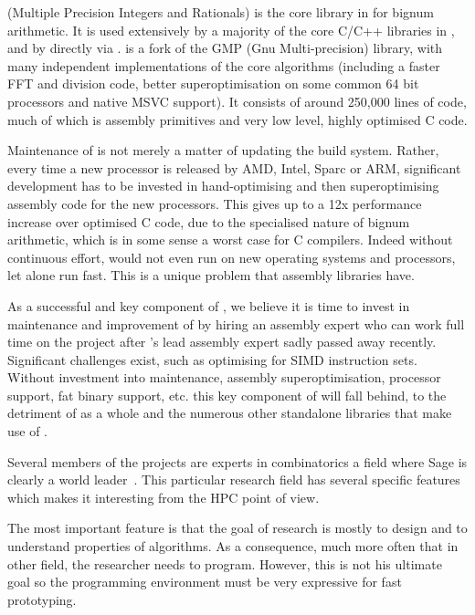 \begin{workpackage}
\begin{tasklist}
\begin{task}[title=\MPIR,id=hpc-mpir, lead=UK,PM=12]
\MPIR (Multiple Precision Integers and Rationals) is the core library in \Sage
for bignum arithmetic. It is used extensively by a majority of the core C/C++
libraries in \Sage, and by \Sage directly via \Cython. \MPIR is a fork of the 
GMP (Gnu Multi-precision) library, with many independent implementations of the
core algorithms (including a faster FFT and division code, better 
superoptimisation on some common 64 bit processors and native MSVC support). 
It consists of around 250,000 lines of code, much of which is assembly 
primitives and very low level, highly optimised C code.

Maintenance of \MPIR is not merely a matter of updating the build system.
Rather, every time a new processor is released by AMD, Intel, Sparc or ARM,
significant development has to be invested in hand-optimising and then
superoptimising assembly code for the new processors. This gives up to a 12x
performance increase over optimised C code, due to the specialised nature of
bignum arithmetic, which is in some sense a worst case for C compilers. Indeed
without continuous effort, \MPIR would not even run on new operating systems and
processors, let alone run fast. This is a unique problem that assembly libraries
have.

As a successful and key component of \Sage, we believe it is time to invest in
maintenance and improvement of \MPIR by hiring an assembly expert who can work
full time on the project after \MPIR's lead assembly expert sadly passed
away recently. Significant challenges exist, such as
optimising for SIMD instruction sets. Without investment into maintenance,
assembly superoptimisation, processor support, fat binary support, etc. this key
component of \Sage will fall behind, to the detriment of \Sage as a whole and the
numerous other standalone libraries that make use of \MPIR.
\end{task}

\begin{task}[title=HPC infrastructure for combinatorics,id=hpc-combi,PM=26,lead=PS,partners={UB}]

  Several members of the projects are experts in combinatorics a field where
  Sage is clearly a world leader~\cite{Sage-Combinat}. This particular research
  field has several specific features which makes it interesting from the HPC
  point of view.

  The most important feature is that the goal of research is mostly to
  design and to understand properties of algorithms. As a consequence,
  much more often that in other field, the researcher needs to
  program. However, this is not his ultimate goal so the programming
  environment must be very expressive for fast prototyping.


\end{task}
\end{tasklist}
\end{workpackage}
